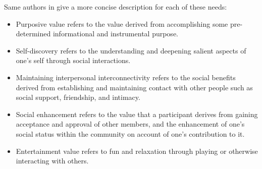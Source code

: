 \documentclass[fleqn,11pt]{olplainarticle}
\begin{document}
Same authors in \cite{cheung2011online} give a more concise description for each of these needs: 
\begin{displayquote}
    \begin{itemize}
        \item Purposive value refers to the value derived from accomplishing some pre-determined informational and instrumental purpose.
        \item Self-discovery refers to the understanding and deepening salient aspects of one’s self through social interactions.
        \item Maintaining interpersonal interconnectivity refers to the social benefits derived from establishing and maintaining contact with other people such as social support, friendship, and intimacy.
        \item Social enhancement refers to the value that a participant derives from gaining acceptance and approval of other members, and the enhancement of one’s social status within the community on account of one’s contribution to it.
        \item Entertainment value refers to fun and relaxation through playing or otherwise interacting with others.
    \end{itemize}
\end{displayquote}
\end{document}
